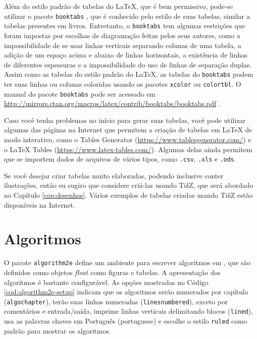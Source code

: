 Além do estilo padrão de tabelas do \LaTeX{}, que é bem permissivo, pode-se utilizar o pacote \texttt{booktabs} \parencite{booktabs}, que é conhecido pelo estilo de suas tabelas, similar a tabelas presentes em livros. Entretanto, o \texttt{booktabs} tem algumas restrições que foram impostas por escolhas de diagramação feitas pelos seus autores, como a impossibilidade de se usar linhas verticais separando colunas de uma tabela, a adição de um espaço acima e abaixo de linhas horizontais, a existência de linhas de diferentes espessuras e a impossibilidade do uso de linhas de separação duplas. Assim como as tabelas do estilo padrão do \LaTeX{}, as tabelas do \texttt{booktabs} podem ter suas linhas ou colunas coloridas usando os pacotes \texttt{xcolor} ou \texttt{colortbl}. O manual do pacote \texttt{booktabs} pode ser acessado em \url{http://mirrors.ctan.org/macros/latex/contrib/booktabs/booktabs.pdf} \parencite{booktabs}. 

Caso você tenha problemas no início para gerar suas tabelas, você pode utilizar algumas das páginas na Internet que permitem a criação de tabelas em \LaTeX{} de modo interativo, como o Tables Generator (\url{https://www.tablesgenerator.com/}) e o \LaTeX{} Tables (\url{https://www.latex-tables.com/}). Algumas delas ainda permitem que se importem dados de arquivos de vários tipos, como \texttt{.csv}, \texttt{.xls} e \texttt{.ods}.

Se você desejar criar tabelas muito elaboradas, podendo inclusive conter ilustrações, então eu sugiro que considere criá-las usando Ti\textit{k}Z, que será abordado no Capítulo \ref{cap:desenhos}. Vários exemplos de tabelas criadas usando Ti\textit{k}Z estão disponíveis na Internet. 

\section{Algoritmos}

O pacote \texttt{algorithm2e} define um ambiente para escrever algoritmos em \LaTeXe, que são definidos como objetos \textit{float} como figuras e tabelas. A apresentação dos algoritmos é bastante configurável.  As opções mostradas no Código \ref{cod:algorithm2e-setup} indicam que os algoritmos serão numerados por capítulo (\texttt{algochapter}), terão suas linhas numeradas (\texttt{linesnumbered}), exceto por comentários e entrada/saída, imprime linhas verticais delimitando blocos (\texttt{lined}), usa as palavras chaves em Português (portuguese) e escolhe o estilo \texttt{ruled} como padrão para mostrar os algoritmos.

